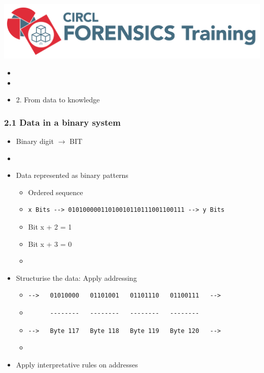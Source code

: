 

\begin{frame}
    \includegraphics[scale=0.3]{images/logo-circl-Forensics.png}
    \begin{itemize}
        \item[]
        \item[]
        \item[] 2. From data to knowledge
    \end{itemize}
\end{frame}


\begin{frame}[fragile]
  \frametitle{2.1 Data in a binary system}
    \begin{itemize}
        \item Binary digit $\to$ BIT
        \item[] 
        \item Data represented as binary patterns
            \begin{itemize}
                \item[] Ordered sequence
                \item[] \begin{verbatim}x Bits --> 01010000011010010110111001100111 --> y Bits\end{verbatim}
                \item[] Bit x + 2 = 1
                \item[] Bit x + 3 = 0
                \item[] 
            \end{itemize}
        \item Structurise the data: Apply addressing
            \begin{itemize}
                \item[] \begin{verbatim}-->   01010000   01101001   01101110   01100111   --> \end{verbatim}
                \item[] \begin{verbatim}      --------   --------   --------   -------- \end{verbatim}
                \item[] \begin{verbatim}-->   Byte 117   Byte 118   Byte 119   Byte 120   --> \end{verbatim}
                \item[] 
            \end{itemize}
        \item Apply interpretative rules on addresses
    \end{itemize}
\end{frame}


